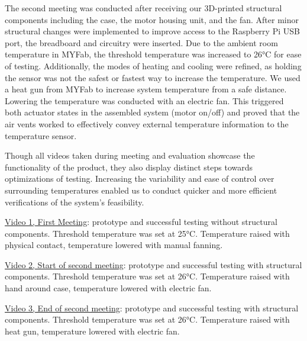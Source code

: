 \documentclass[11pt]{article}
\begin{document}
The second meeting was conducted after receiving our 3D-printed structural components including the case, the motor housing unit, and the fan. After minor structural changes were implemented to improve access to the Raspberry Pi USB port, the breadboard and circuitry were inserted. Due to the ambient room temperature in MYFab, the threshold temperature was increased to 26°C for ease of testing. Additionally, the modes of heating and cooling were refined, as holding the sensor was not the safest or fastest way to increase the temperature. We used a heat gun from MYFab to increase system temperature from a safe distance. Lowering the temperature was conducted with an electric fan. This triggered both actuator states in the assembled system (motor on/off) and proved that the air vents worked to effectively convey external temperature information to the temperature sensor. 

Though all videos taken during meeting and evaluation showcase the functionality of the product, they also display distinct steps towards optimizations of testing. Increasing the variability and ease of control over surrounding temperatures enabled us to conduct quicker and more efficient verifications of the system’s feasibility. 

\href{https://youtu.be/O1di9BagJPE}{Video 1, First Meeting}: prototype and successful testing without structural components. Threshold temperature was set at 25°C. Temperature raised with physical contact, temperature lowered with manual fanning.

\href{https://youtu.be/K5c0lNJ9v3A}{Video 2, Start of second meeting}: prototype and successful testing with structural components. Threshold temperature was set at 26°C. Temperature raised with hand around case, temperature lowered with electric fan.

\href{https://youtu.be/0W4DSpp6AJQ}{Video 3, End of second meeting}: prototype and successful testing with structural components. Threshold temperature was set at 26°C. Temperature raised with heat gun, temperature lowered with electric fan.


\end{document}
